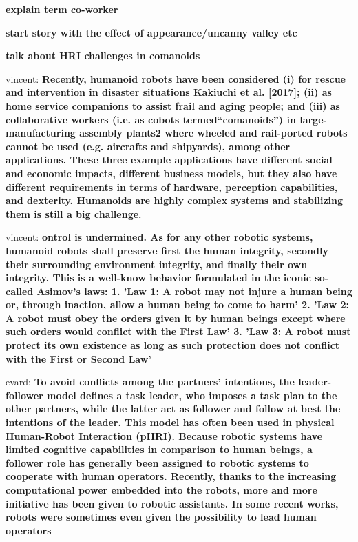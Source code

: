 \documentclass[a4paper, 11pt, oneside]{Thesis}
\begin{document}
\textbf{explain term co-worker}

\textbf{start story with the effect of appearance/uncanny valley etc}

\textbf{talk about HRI challenges in comanoids}

vincent: \textbf{Recently, humanoid robots have been considered (i) for rescue and intervention in disaster situations Kakiuchi et al. [2017]; (ii) as home service companions to assist frail and aging people; and (iii) as collaborative workers (i.e. as cobots termed“comanoids”) in large-manufacturing assembly plants2 where wheeled and rail-ported robots cannot be used (e.g. aircrafts and shipyards), among other applications. These three example applications have different social and economic impacts, different business models, but they also have different requirements in terms of hardware, perception capabilities, and dexterity. Humanoids are highly complex systems and stabilizing them is still a big challenge.
}

vincent: \textbf{ontrol is undermined.
	As for any other robotic systems, humanoid robots shall preserve first the human
	integrity, secondly their surrounding environment integrity, and finally their own integrity. This is a well-know behavior formulated in the iconic so-called Asimov’s laws:
	1. ’Law 1: A robot may not injure a human being or, through inaction, allow a
	human being to come to harm’
	2. ’Law 2: A robot must obey the orders given it by human beings except where
	such orders would conflict with the First Law’
	3. ’Law 3: A robot must protect its own existence as long as such protection does
	not conflict with the First or Second Law’
}


evard: \textbf{	To avoid conflicts among the partners’ intentions, the leader-follower model
	defines a task leader, who imposes a task plan to the other partners, while the latter
	act as follower and follow at best the intentions of the leader. This model has often
	been used in physical Human-Robot Interaction (pHRI). Because robotic systems
	have limited cognitive capabilities in comparison to human beings, a follower role
	has generally been assigned to robotic systems to cooperate with human operators.
	Recently, thanks to the increasing computational power embedded into the robots,
	more and more initiative has been given to robotic assistants. In some recent works,
	robots were sometimes even given the possibility to lead human operators}
\end{document}
